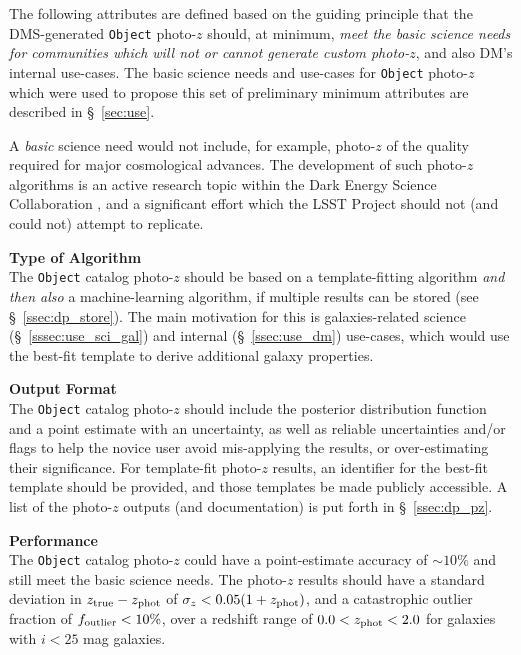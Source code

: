 \documentclass[DM,lsstdraft,toc]{lsstdoc}
\begin{document}
The following attributes are defined based on the guiding principle that the DMS-generated {\tt Object} photo-$z$ should, at minimum, {\it meet the basic science needs for communities which will not or cannot generate custom photo-$z$}, and also DM's internal use-cases.
The basic science needs and use-cases for {\tt Object} photo-$z$ which were used to propose this set of preliminary minimum attributes are described in \S~\ref{sec:use}.

A {\it basic} science need would not include, for example, photo-$z$ of the quality required for major cosmological advances.
The development of such photo-$z$ algorithms is an active research topic within the Dark Energy Science Collaboration \citep{2018arXiv180901669T}, and a significant effort which the LSST Project should not (and could not) attempt to replicate. 

{\bf Type of Algorithm}\\
The {\tt Object} catalog photo-$z$ should be based on a template-fitting algorithm {\it and then also} a machine-learning algorithm, if multiple results can be stored (see \S~\ref{ssec:dp_store}).
The main motivation for this is galaxies-related science (\S~\ref{sssec:use_sci_gal}) and internal (\S~\ref{ssec:use_dm}) use-cases, which would use the best-fit template to derive additional galaxy properties.

{\bf Output Format}\\
The {\tt Object} catalog photo-$z$ should include the posterior distribution function and a point estimate with an uncertainty, as well as reliable uncertainties and/or flags to help the novice user avoid mis-applying the results, or over-estimating their significance.
For template-fit photo-$z$ results, an identifier for the best-fit template should be provided, and those templates be made publicly accessible.
A list of the photo-$z$ outputs (and documentation) is put forth in \S~\ref{ssec:dp_pz}.

{\bf Performance}\\
The {\tt Object} catalog photo-$z$ could have a point-estimate accuracy of $\sim10\%$ and still meet the basic science needs.
The photo-$z$ results should have a standard deviation in $z_{\rm true}-z_{\rm phot}$ of $\sigma_z < 0.05(1+z_{\rm phot})$, and a catastrophic outlier fraction of $f_{\rm outlier} < 10\%$, over a redshift range of $0.0 < z_{\rm phot} < 2.0$ for galaxies with $i<25$ mag galaxies.



\clearpage
\end{document}
